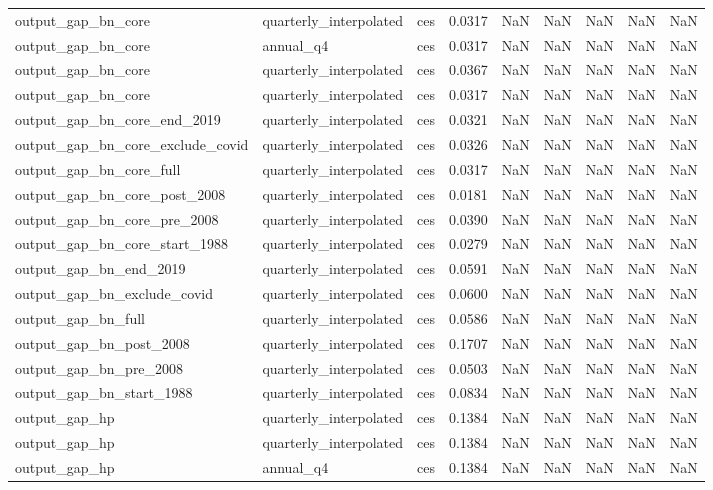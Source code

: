 \begin{tabular}{lllrrrrrr}
output\_gap\_bn\_core & quarterly\_interpolated & ces & 0.0317 & NaN & NaN & NaN & NaN & NaN \\
output\_gap\_bn\_core & annual\_q4 & ces & 0.0317 & NaN & NaN & NaN & NaN & NaN \\
output\_gap\_bn\_core & quarterly\_interpolated & ces & 0.0367 & NaN & NaN & NaN & NaN & NaN \\
output\_gap\_bn\_core & quarterly\_interpolated & ces & 0.0317 & NaN & NaN & NaN & NaN & NaN \\
output\_gap\_bn\_core\_end\_2019 & quarterly\_interpolated & ces & 0.0321 & NaN & NaN & NaN & NaN & NaN \\
output\_gap\_bn\_core\_exclude\_covid & quarterly\_interpolated & ces & 0.0326 & NaN & NaN & NaN & NaN & NaN \\
output\_gap\_bn\_core\_full & quarterly\_interpolated & ces & 0.0317 & NaN & NaN & NaN & NaN & NaN \\
output\_gap\_bn\_core\_post\_2008 & quarterly\_interpolated & ces & 0.0181 & NaN & NaN & NaN & NaN & NaN \\
output\_gap\_bn\_core\_pre\_2008 & quarterly\_interpolated & ces & 0.0390 & NaN & NaN & NaN & NaN & NaN \\
output\_gap\_bn\_core\_start\_1988 & quarterly\_interpolated & ces & 0.0279 & NaN & NaN & NaN & NaN & NaN \\
output\_gap\_bn\_end\_2019 & quarterly\_interpolated & ces & 0.0591 & NaN & NaN & NaN & NaN & NaN \\
output\_gap\_bn\_exclude\_covid & quarterly\_interpolated & ces & 0.0600 & NaN & NaN & NaN & NaN & NaN \\
output\_gap\_bn\_full & quarterly\_interpolated & ces & 0.0586 & NaN & NaN & NaN & NaN & NaN \\
output\_gap\_bn\_post\_2008 & quarterly\_interpolated & ces & 0.1707 & NaN & NaN & NaN & NaN & NaN \\
output\_gap\_bn\_pre\_2008 & quarterly\_interpolated & ces & 0.0503 & NaN & NaN & NaN & NaN & NaN \\
output\_gap\_bn\_start\_1988 & quarterly\_interpolated & ces & 0.0834 & NaN & NaN & NaN & NaN & NaN \\
output\_gap\_hp & quarterly\_interpolated & ces & 0.1384 & NaN & NaN & NaN & NaN & NaN \\
output\_gap\_hp & quarterly\_interpolated & ces & 0.1384 & NaN & NaN & NaN & NaN & NaN \\
output\_gap\_hp & annual\_q4 & ces & 0.1384 & NaN & NaN & NaN & NaN & NaN \\

\end{tabular}
